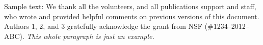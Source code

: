 \documentclass{sigchi}
\begin{document}
Sample text: We thank all the volunteers, and all publications support
and staff, who wrote and provided helpful comments on previous
versions of this document. Authors 1, 2, and 3 gratefully acknowledge
the grant from NSF (\#1234--2012--ABC). \textit{This whole paragraph is
  just an example.}
  


%
%
%
%
%
\balance{}
\balance{}



\end{document}
